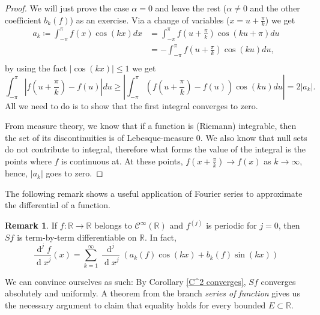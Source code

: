 \documentclass[12pt]{amsart}
\theoremstyle{definition}
\newtheorem{remark}[theorem]{Remark}
\newcommand{\RR}{{\mathbb R}} %
\newcommand{\cC}{{\mathcal C}}
\newcommand{\de}{\operatorname{d}} %
\begin{document}
\begin{proof}\footnotemark{} We will just prove the case $\alpha = 0$ and leave the rest ($\alpha \neq 0$ and the other coefficient $b_k(f)$) as an exercise. Via a change of variables ($x = u + \frac{\pi}{k}$) we get
%
    \[
    \begin{aligned}
        a_k \coloneqq \int_{-\pi}^{\pi}f(x)\cos(kx) dx &= \int_{-\pi}^{\pi}f(u + \frac{\pi}{k})\cos(ku + \pi) du\\
        &= - \int_{-\pi}^{\pi}f(u + \frac{\pi}{k})\cos(ku) du,\\
        \end{aligned}
    \]
        by using the fact $|\cos(kx)| \leq 1$ we get
    \[
        \int_{-\pi}^{\pi}|f(u + \frac{\pi}{k}) - f(u)|du \geq \left|\int_{-\pi}^{\pi}(f(u + \frac{\pi}{k}) - f(u))\cos(ku)du\right| = 2|a_k|.
    \]
All we need to do is to show that the first integral converges to zero.\footnotemark{}




From measure theory, we know that if a function is (Riemann) integrable, then the set of its discontinuities is of Lebesque-measure 0. We also know that null sets do not contribute to integral, therefore what forms the value of the integral is the points where $f$ is continuous at. At these points, $f(x + \frac{\pi}{k}) \to f(x)$ as $k \to \infty$, hence, $|a_k|$ goes to zero. \qedhere



\end{proof}


The following remark shows a useful application of Fourier series to approximate the differential of a function.


\begin{remark}
    If $f: \RR \to \RR$ belongs to $\cC^\infty(\RR)$ and $f^{(j)}$ is periodic for $j = 0$, then $Sf$ is term-by-term differentiable on $\RR$. In fact,
\[
\frac{\de ^jf}{{\de x}^j}(x) = \sum_{k = 1}^{\infty} \frac{\de ^j}{{\de x}^j}(a_k(f)\cos(kx) + b_k(f)\sin(kx))
\]
\end{remark}



    We can convince ourselves as such: By Corollary \ref{C^2 converges}, $Sf$ converges absolutely and uniformly. A theorem\footnotemark{}
    from the branch \emph{series of function} gives us the necessary argument to claim that equality holds for every bounded $E \subset \RR$.
\end{document}
